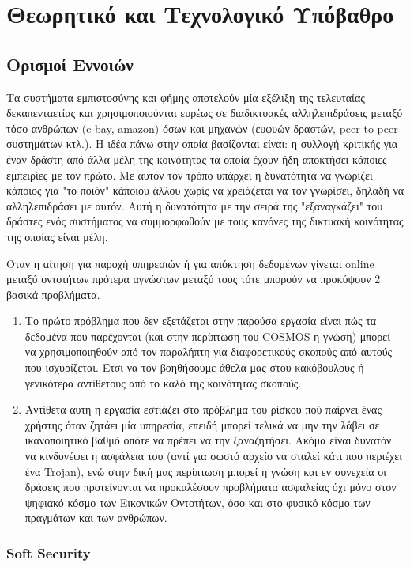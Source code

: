 \chapter{Θεωρητικό και Τεχνολογικό Υπόβαθρο}\label{ch:bkg}
\section{Ορισμοί Εννοιών}

Τα συστήματα εμπιστοσύνης και φήμης αποτελούν μία εξέλιξη της τελευταίας δεκαπενταετίας και χρησιμοποιούνται ευρέως σε διαδικτυακές αλληλεπιδράσεις μεταξύ τόσο ανθρώπων (e-bay, amazon) όσων και μηχανών (ευφυών δραστών, peer-to-peer συστημάτων κτλ.). Η ιδέα πάνω στην οποία βασίζονται είναι: η συλλογή κριτικής για έναν δράστη από άλλα μέλη της κοινότητας τα οποία έχουν ήδη αποκτήσει κάποιες εμπειρίες με τον πρώτο. Με αυτόν τον τρόπο υπάρχει η δυνατότητα να γνωρίζει κάποιος για "το ποιόν"  κάποιου άλλου χωρίς να χρειάζεται να τον γνωρίσει, δηλαδή να αλληλεπιδράσει με αυτόν. Αυτή η δυνατότητα με την σειρά της "εξαναγκάζει" του δράστες ενός συστήματος να συμμορφωθούν με τους κανόνες της δικτυακή κοινότητας της οποίας είναι μέλη.

Όταν η αίτηση για παροχή υπηρεσιών ή για απόκτηση δεδομένων γίνεται online μεταξύ οντοτήτων πρότερα αγνώστων μεταξύ τους τότε μπορούν να προκύψουν 2 βασικά προβλήματα.
\begin{enumerate}
\item Το πρώτο πρόβλημα που δεν εξετάζεται στην παρούσα εργασία είναι πώς τα δεδομένα που παρέχονται (και στην περίπτωση του COSMOS η γνώση) μπορεί να χρησιμοποιηθούν από τον παραλήπτη για διαφορετικούς σκοπούς από αυτούς που ισχυρίζεται. Έτσι να τον βοηθήσουμε άθελα μας στου κακόβουλους ή γενικότερα αντίθετους από το καλό της κοινότητας σκοπούς.

\item Αντίθετα αυτή η εργασία εστιάζει στο πρόβλημα του ρίσκου πού παίρνει ένας χρήστης όταν ζητάει μία υπηρεσία, επειδή μπορεί τελικά να μην την λάβει σε ικανοποιητικό βαθμό οπότε να πρέπει να την ξαναζητήσει. Ακόμα είναι δυνατόν να κινδυνέψει η ασφάλεια του (αντί για σωστό αρχείο να σταλεί κάτι που περιέχει ένα Trojan), ενώ στην δική μας περίπτωση μπορεί η γνώση και εν συνεχεία οι δράσεις που προτείνονται να προκαλέσουν προβλήματα ασφαλείας όχι μόνο στον ψηφιακό κόσμο  των Εικονικών Οντοτήτων, όσο και στο φυσικό κόσμο των πραγμάτων και των ανθρώπων.
\end{enumerate}

\subsection{Soft Security}


